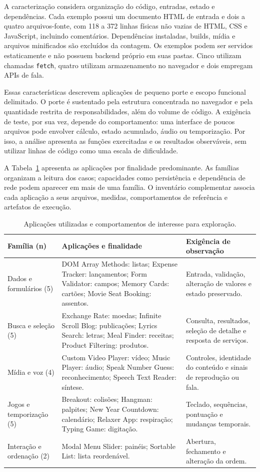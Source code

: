 \documentclass[12pt]{article}
\begin{document}
A caracterização considera organização do código, entradas, estado e dependências. Cada exemplo possui um documento HTML de entrada e dois a quatro arquivos-fonte, com 118 a 372 linhas físicas não vazias de HTML, CSS e JavaScript, incluindo comentários. Dependências instaladas, builds, mídia e arquivos minificados são excluídos da contagem. Os exemplos podem ser servidos estaticamente e não possuem backend próprio em suas pastas. Cinco utilizam chamadas \texttt{fetch}, quatro utilizam armazenamento no navegador e dois empregam APIs de fala.

Essas características descrevem aplicações de pequeno porte e escopo funcional delimitado. O porte é sustentado pela estrutura concentrada no navegador e pela quantidade restrita de responsabilidades, além do volume de código. A exigência de teste, por sua vez, depende do comportamento: uma interface de poucos arquivos pode envolver cálculo, estado acumulado, áudio ou temporização. Por isso, a análise apresenta as funções exercitadas e os resultados observáveis, sem utilizar linhas de código como uma escala de dificuldade.

A Tabela~\ref{tab:corpus} apresenta as aplicações por finalidade predominante. As famílias organizam a leitura dos casos; capacidades como persistência e dependência de rede podem aparecer em mais de uma família. O inventário complementar associa cada aplicação a seus arquivos, medidas, comportamentos de referência e artefatos de execução.

\begin{table}[ht]
\centering
\caption{Aplicações utilizadas e comportamentos de interesse para exploração.}
\label{tab:corpus}
\footnotesize
\begin{tabular}{>{\raggedright\arraybackslash}p{2.6cm}>{\raggedright\arraybackslash}p{6.4cm}>{\raggedright\arraybackslash}p{4.5cm}}
\toprule
Família (n) & Aplicações e finalidade & Exigência de observação\\
\midrule
Dados e formulários (5) & DOM Array Methods: listas; Expense Tracker: lançamentos; Form Validator: campos; Memory Cards: cartões; Movie Seat Booking: assentos. & Entrada, validação, alteração de valores e estado preservado.\\
Busca e seleção (5) & Exchange Rate: moedas; Infinite Scroll Blog: publicações; Lyrics Search: letras; Meal Finder: receitas; Product Filtering: produtos. & Consulta, resultados, seleção de detalhe e resposta de serviços.\\
Mídia e voz (4) & Custom Video Player: vídeo; Music Player: áudio; Speak Number Guess: reconhecimento; Speech Text Reader: síntese. & Controles, identidade do conteúdo e sinais de reprodução ou fala.\\
Jogos e temporização (5) & Breakout: colisões; Hangman: palpites; New Year Countdown: calendário; Relaxer App: respiração; Typing Game: digitação. & Teclado, sequências, pontuação e mudanças temporais.\\
Interação e ordenação (2) & Modal Menu Slider: painéis; Sortable List: lista reordenável. & Abertura, fechamento e alteração da ordem.\\
\bottomrule
\end{tabular}
\end{table}
\end{document}
